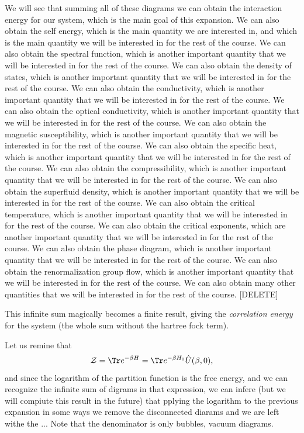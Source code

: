 We will see that summing all of these diagrams we can obtain the interaction energy for our system, which is the main goal of this expansion. We can also obtain the self energy, which is the main quantity we are interested in, and which is the main quantity we will be interested in for the rest of the course. We can also obtain the spectral function, which is another important quantity that we will be interested in for the rest of the course. We can also obtain the density of states, which is another important quantity that we will be interested in for the rest of the course. We can also obtain the conductivity, which is another important quantity that we will be interested in for the rest of the course. We can also obtain the optical conductivity, which is another important quantity that we will be interested in for the rest of the course. We can also obtain the magnetic susceptibility, which is another important quantity that we will be interested in for the rest of the course. We can also obtain the specific heat, which is another important quantity that we will be interested in for the rest of the course. We can also obtain the compressibility, which is another important quantity that we will be interested in for the rest of the course. We can also obtain the superfluid density, which is another important quantity that we will be interested in for the rest of the course. We can also obtain the critical temperature, which is another important quantity that we will be interested in for the rest of the course. We can also obtain the critical exponents, which are another important quantity that we will be interested in for the rest of the course. We can also obtain the phase diagram, which is another important quantity that we will be interested in for the rest of the course. We can also obtain the renormalization group flow, which is another important quantity that we will be interested in for the rest of the course. We can also obtain many other quantities that we will be interested in for the rest of the course. [DELETE]

This infinite sum magically becomes a finite result, giving the \textit{correlation energy} for the system (the whole sum without the hartree fock term).

Let us remine that
\[
    \mathcal{Z} = \Tr e^{-\beta H} = \Tr e^{-\beta H_0} \hat{U}(\beta, 0),
\]
and since the logarithm of the partition function is the free energy, and we can recognize the infinite sum of digrams in that expression, we can infere (but we will compiute this result in the future) that pplying the logarithm to the previous expansion in some ways we remove the disconnected diarams and we are left withe the ...
Note that the denominator is only bubbles, vacuum diagrams.



